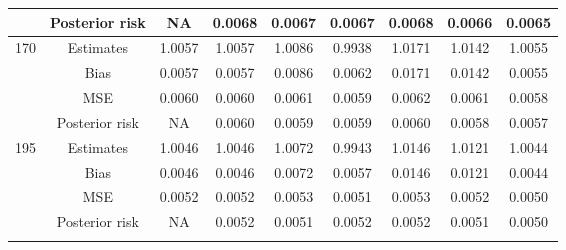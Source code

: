 \documentclass[a4paper,12pt]{report}
\begin{document}
\begin{minipage}{\linewidth}
{\begin{tabular}{|c|c|c|c|c|c|c|c|c|}
			&Posterior risk    &NA &0.0068 &0.0067 &0.0067 &0.0068 &0.0066 &0.0065 \\ \hline
			170&Estimates      &1.0057 &1.0057 &1.0086 &0.9938 &1.0171 &1.0142 &1.0055 \\
			&Bias           &0.0057 &0.0057 &0.0086 &0.0062 &0.0171 &0.0142 &0.0055 \\
			&MSE            &0.0060 &0.0060 &0.0061 &0.0059 &0.0062 &0.0061 &0.0058 \\
			&Posterior risk    &NA &0.0060 &0.0059 &0.0059 &0.0060 &0.0058 &0.0057 \\ \hline
			195				&Estimates      &1.0046 &1.0046 &1.0072 &0.9943 &1.0146 &1.0121 &1.0044 \\
			&Bias           &0.0046 &0.0046 &0.0072 &0.0057 &0.0146 &0.0121 &0.0044 \\
			&MSE            &0.0052 &0.0052 &0.0053 &0.0051 &0.0053 &0.0052 &0.0050 \\
			&Posterior risk    &NA &0.0052 &0.0051 &0.0052 &0.0052 &0.0051 &0.0050 \\ \hline
			\ECC
		\end{tabular}
	}
\end{minipage}\vspace{1em}\\
\newpage

{\\\vspace{1cm}}
\end{document}
